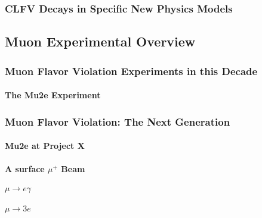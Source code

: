 \subsubsection{CLFV Decays in Specific New Physics Models}




\subsection{Muon Experimental Overview}\label{sec:cl:muexp}

\subsubsection{Muon Flavor Violation Experiments in this Decade}
\paragraph{The Mu2e Experiment}


\subsubsection{Muon Flavor Violation: The Next Generation}

\paragraph{Mu2e at Project X}


\paragraph{A surface $\mu^+$ Beam}


\paragraph{$\mu \to e \gamma$}


\paragraph{$\mu \to 3e$}


